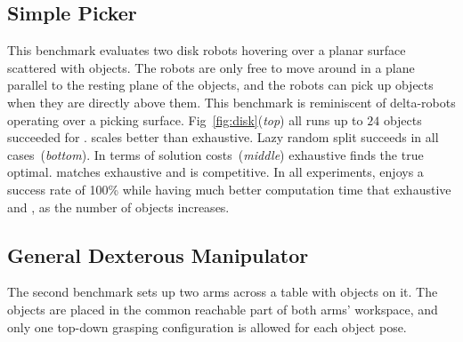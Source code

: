 \subsection{Simple Picker}
This benchmark evaluates two disk robots hovering over a planar surface scattered with objects. The robots are only free to move around in a plane parallel to the resting plane of the objects, and the robots can pick up objects when they are directly above them. This benchmark is reminiscent of delta-robots operating over a picking surface. Fig~\ref{fig:disk}(\textit{top}) all runs up to $ 24 $ objects succeeded for \algo. \milp scales better than exhaustive. Lazy random split succeeds in all cases~(\textit{bottom}). In terms of solution costs~(\textit{middle}) exhaustive finds the true optimal. \milp matches exhaustive and \algo is competitive. In all experiments, \algo enjoys a success rate of 100\% while having much better computation time that exhaustive and \milp, as the number of objects increases. 


\subsection{General Dexterous Manipulator} The second benchmark sets up two \kuka arms across a table with objects on it. The objects are placed in the common reachable part of both arms' workspace, and only one top-down grasping configuration is allowed for each object pose. 

